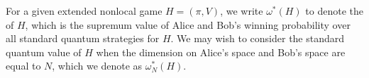 

For a given extended nonlocal game $H = (\pi,V)$, we write $\omega^*(H)$ to denote the  of $H$, which is the supremum value of Alice and Bob's winning probability over all standard quantum strategies for $H$. We may wish to consider the standard quantum value of $H$ when the dimension on Alice's space and Bob's space are equal to $N$, which we denote as $\omega_N^*(H)$. %

